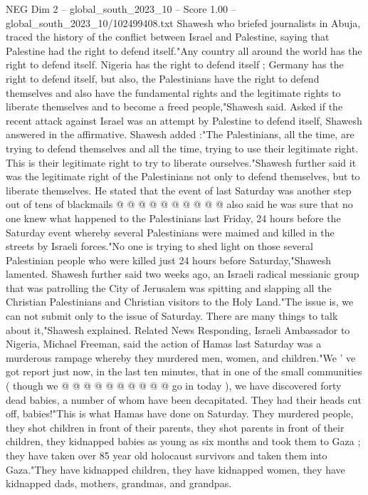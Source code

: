 \begin{textsample}{NEG Dim 2 – global\_south\_2023\_10 – Score 1.00 – global\_south\_2023\_10/102499408.txt}  \label{ex:f2_neg_391}
Shawesh who briefed journalists in Abuja, traced the history of the conflict between Israel and Palestine, saying that Palestine had the right to defend itself."Any country all around the world has the right to defend itself.
Nigeria has the right to defend itself ; Germany has the right to defend itself, but also, the Palestinians have the right to defend themselves and also have the fundamental rights and the legitimate rights to liberate themselves and to become a freed people,"Shawesh said.
Asked if the recent attack against Israel was an attempt by Palestine to defend itself, Shawesh answered in the affirmative.
Shawesh added :"The Palestinians, all the time, are trying to defend themselves and all the time, trying to use their legitimate right.
This is their legitimate right to try to liberate ourselves."Shawesh further said it was the legitimate right of the Palestinians not only to defend themselves, but to liberate themselves.
He stated that the event of last Saturday was another step out of tens of blackmails @ @ @ @ @ @ @ @ @ @ also said he was sure that no one knew what happened to the Palestinians last Friday, 24 hours before the Saturday event whereby several Palestinians were maimed and killed in the streets by Israeli forces."No one is trying to shed light on those several Palestinian people who were killed just 24 hours before Saturday,"Shawesh lamented.
Shawesh further said two weeks ago, an Israeli radical messianic group that was patrolling the City of Jerusalem was spitting and slapping all the Christian Palestinians and Christian visitors to the Holy Land."The issue is, we can not submit only to the issue of Saturday.
There are many things to talk about it,"Shawesh explained.
Related News Responding, Israeli Ambassador to Nigeria, Michael Freeman, said the action of Hamas last Saturday was a murderous rampage whereby they murdered men, women, and children."We ' ve got report just now, in the last ten minutes, that in one of the small communities ( though we @ @ @ @ @ @ @ @ @ @ go in today ), we have discovered forty dead babies, a number of whom have been decapitated.
They had their heads cut off, babies!"This is what Hamas have done on Saturday.
They murdered people, they shot children in front of their parents, they shot parents in front of their children, they kidnapped babies as young as six months and took them to Gaza ; they have taken over 85 year old holocaust survivors and taken them into Gaza."They have kidnapped children, they have kidnapped women, they have kidnapped dads, mothers, grandmas, and grandpas.

\end{textsample}
